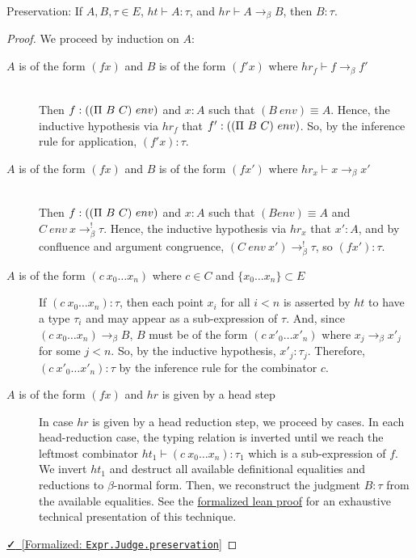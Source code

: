 \documentclass{lmcs}
\newcommand{\leanlink}[2]{
  \href{#1}{\textcolor{black}\faCheck~[Formalized: \texttt{#2}]}%
}
\newcommand{\arr}{\rightarrow}
\newcommand{\barr}{\arr_{\beta}}
\begin{document}
\begin{thm}\label{thm:preservation}
  Preservation: If \(A, B, \tau \in E\), \(ht \vdash A : \tau\), and \(hr \vdash A \barr B\), then \(B : \tau\).
\end{thm}

\begin{proof}
  We proceed by induction on \(A\):
  \begin{description}
    \item[\(A\) is of the form \((f x)\) and \(B\) is of the form \((f' x)\) where \(hr_f \vdash f \barr f'\)] \hfill \\ Then \(f : (\comb[\Pi][B][C]\ env)\) and \(x : A\) such that \((B\ env) \equiv A\). Hence, the inductive hypothesis via \(hr_f\) that \(f' : (\comb[\Pi][B][C]\ env)\). So, by the inference rule for application, \((f' x) : \tau\).
    \item[\(A\) is of the form \((f x)\) and \(B\) is of the form \((f x')\) where \(hr_x \vdash x \barr x'\)] \hfill \\ Then \(f : (\comb[\Pi][B][C]\ env)\) and \(x : A\) such that \((B env) \equiv A\) and \(C\ env\ x \barr^{!} \tau\). Hence, the inductive hypothesis via \(hr_x\) that \(x' : A\), and by confluence and argument congruence, \((C\ env\ x') \barr^{!} \tau\), so \((f x') : \tau\).
    \item[\(A\) is of the form \((c\ x_0 \ldots x_n)\) where \(c \in C\) and \(\{x_0 \ldots x_n\} \subset E\)]  If \((c\ x_0 \ldots x_n) : \tau\), then each point \(x_i\) for all \(i < n\) is asserted by \(ht\) to have a type \(\tau_{i}\) and may appear as a sub-expression of \(\tau\). And, since \((c\ x_0 \ldots x_n) \barr B\), \(B\) must be of the form \((c\ x'_0 \ldots x'_n)\) where \(x_j \barr x'_j\) for some \(j < n\). So, by the inductive hypothesis, \(x'_j : \tau_j\). Therefore, \((c\ x'_0 \ldots x'_n) : \tau\) by the inference rule for the combinator \(c\).
    \item[\(A\) is of the form \((f x)\) and \(hr\) is given by a head step] In case \(hr\) is given by a head reduction step, we proceed by cases. In each head-reduction case, the typing relation is inverted until we reach the leftmost combinator \(ht_1 \vdash (c\ x_0 \ldots x_n) : \tau_1\) which is a sub-expression of \(f\). We invert \(ht_1\) and destruct all available definitional equalities and reductions to \(\beta\)-normal form. Then, we reconstruct the judgment \(B : \tau\) from the available equalities. See the \href{https://github.com/lexzaiello/DCC/blob/fb7acf6d9644df7d13c809d12609b59eaca5c763/Dcc/Metatheory/SubjectReduction.lean\#L965}{formalized lean proof} for an exhaustive technical presentation of this technique.
    \end{description}
  \noindent \leanlink{https://github.com/lexzaiello/DCC/blob/fb7acf6d9644df7d13c809d12609b59eaca5c763/Dcc/Metatheory/SubjectReduction.lean\#L965}{Expr.Judge.preservation}
\end{proof}
\end{document}
